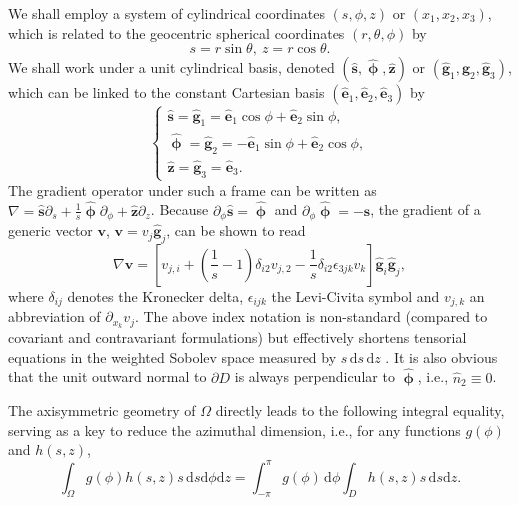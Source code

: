 \documentclass[extra,referee]{gji}
\begin{document}
We shall employ a system of cylindrical coordinates $\left(s,\phi,z\right)$
or $\left(x_1,x_2,x_3\right)$, which is related to the geocentric spherical 
coordinates $\left(r,\theta,\phi\right)$ by
\begin{equation}
  s=r\sin\theta,\ z=r\cos\theta.
\end{equation}
We shall work under a unit cylindrical basis, denoted  
$\left(\hat{\mathbf{s}},\hat{\mathbf{\upphi}},\hat{\mathbf{z}}\right)$
or $\left(\hat{\mathbf{g}}_{1},\hat{\mathbf{g}}_{2},\hat{\mathbf{g}}_{3}\right)$, 
which can be linked to the constant Cartesian basis 
$\left(\hat{\mathbf{e}}_{1},\hat{\mathbf{e}}_{2},\hat{\mathbf{e}}_{3}\right)$ by
\begin{equation}
  \begin{cases}
    \hat{\mathbf{s}}=\hat{\mathbf{g}}_1=\hat{\mathbf{e}}_{1}\cos\phi 
    + \hat{\mathbf{e}}_{2}\sin\phi, \\
    \hat{\mathbf{\upphi}}=\hat{\mathbf{g}}_2=-\hat{\mathbf{e}}_{1}\sin\phi 
    + \hat{\mathbf{e}}_{2}\cos\phi, \\
    \hat{\mathbf{z}}=\hat{\mathbf{g}}_3=\hat{\mathbf{e}}_3.
  \end{cases}
\end{equation}
The gradient operator under such a frame can be written as
$\nabla=\hat{\mathbf{s}}\partial_{s}+
\frac{1}{s}\hat{\mathbf{\upphi}}\partial_{\phi}+
\hat{\mathbf{z}}\partial_{z}$.
Because $\partial_{\phi}\hat{\mathbf{s}}=\hat{\mathbf{\upphi}}$ and 
$\partial_{\phi}\hat{\mathbf{\upphi}}=-\hat{\mathbf{s}}$,
the gradient of a generic vector $\mathbf{v}$, 
$\mathbf{v}=v_{j}\hat{\mathbf{g}}_{j}$, can be shown to read
\begin{equation}
\nabla\mathbf{v}=\left[v_{j,i}+\left(\frac{1}{s}-1\right)\delta_{i2}v_{j,2}
-\frac{1}{s}\delta_{i2}\epsilon_{3jk}v_{k}\right]
\hat{\mathbf{g}}_{i}\hat{\mathbf{g}}_{j},
\label{eq:grad}
\end{equation}
where $\delta_{ij}$ denotes the Kronecker delta, $\epsilon_{ijk}$ the
Levi-Civita symbol and $v_{j,k}$ an abbreviation of $\partial_{x_k}v_j$.
The above index notation is non-standard (compared to covariant and
contravariant formulations) but effectively shortens tensorial
equations in the weighted Sobolev space measured by $s\,\text{d}s\,\text{d}z$ 
\cite[Chap 2,][]{bernardi1999spectral}. 
It is also obvious that the unit outward
normal to $\partial D$ is always perpendicular to $\hat{\mathbf{\upphi}}$,
i.e., $\hat{n}_{2}\equiv0$.

The axisymmetric geometry of $\Omega$ directly leads to the following integral
equality, serving as a key to reduce the azimuthal dimension, 
i.e., for any functions $g(\phi)$ and $h(s,z)$, 
\begin{equation}
\int_{\Omega}g(\phi)h(s,z)s\,\text{d}s \text{d}\phi \text{d}z=
\int_{-\pi}^{\pi}g(\phi)\,\text{d}\phi\int_{D}h(s,z)s\,\text{d}s\text{d}z.
\label{eq:ieq}
\end{equation}
\end{document}
